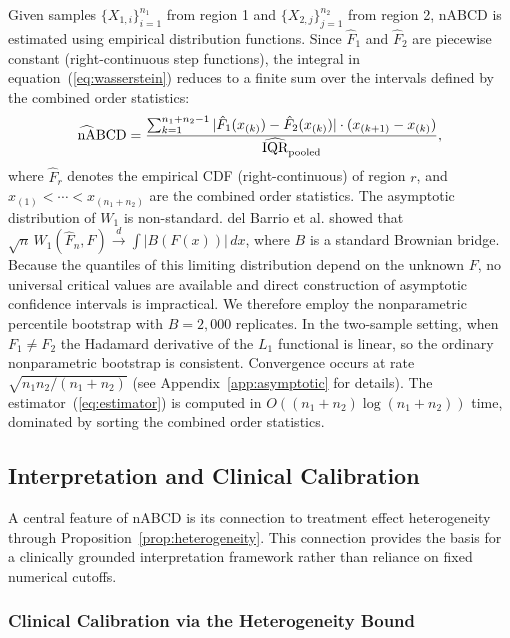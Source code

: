 \documentclass[AMA,Times1COL]{WileyNJDv5}
\newcommand{\hnABCD}{\mathrlap{\widehat{\phantom{\text{nA}}}}\text{nABCD}}
\begin{document}
Given samples $\{X_{1,i}\}_{i=1}^{n_1}$ from region 1 and $\{X_{2,j}\}_{j=1}^{n_2}$ from region 2, nABCD is estimated using empirical distribution functions. Since $\hat{F}_1$ and $\hat{F}_2$ are piecewise constant (right-continuous step functions), the integral in equation~(\ref{eq:wasserstein}) reduces to a finite sum over the intervals defined by the combined order statistics:
\begin{equation}
\hnABCD = \frac{\sum_{k=1}^{n_1+n_2-1} |\hat{F}_1(x_{(k)}) - \hat{F}_2(x_{(k)})| \cdot (x_{(k+1)} - x_{(k)})}{\widehat{\text{IQR}}_{\text{pooled}}},
\label{eq:estimator}
\end{equation}
where $\hat{F}_r$ denotes the empirical CDF (right-continuous) of region $r$, and $x_{(1)} < \cdots < x_{(n_1+n_2)}$ are the combined order statistics. The asymptotic distribution of $W_1$ is non-standard. del Barrio et al.\cite{delbarrio1999} showed that $\sqrt{n}\,W_1(\hat{F}_n, F) \xrightarrow{d} \int |B(F(x))|\,dx$, where $B$ is a standard Brownian bridge. Because the quantiles of this limiting distribution depend on the unknown $F$, no universal critical values are available and direct construction of asymptotic confidence intervals is impractical. We therefore employ the nonparametric percentile bootstrap with $B = 2{,}000$ replicates.\cite{efron1993} In the two-sample setting, when $F_1 \neq F_2$ the Hadamard derivative of the $L_1$ functional is linear, so the ordinary nonparametric bootstrap is consistent.\cite{sommerfeld2018} Convergence occurs at rate $\sqrt{n_1 n_2/(n_1+n_2)}$ (see Appendix~\ref{app:asymptotic} for details). The estimator~(\ref{eq:estimator}) is computed in $O((n_1 + n_2) \log(n_1 + n_2))$ time, dominated by sorting the combined order statistics.

\subsection{Interpretation and Clinical Calibration}\label{sec:inference}

A central feature of nABCD is its connection to treatment effect heterogeneity through Proposition~\ref{prop:heterogeneity}. This connection provides the basis for a clinically grounded interpretation framework rather than reliance on fixed numerical cutoffs.

\subsubsection{Clinical Calibration via the Heterogeneity Bound}
\end{document}
